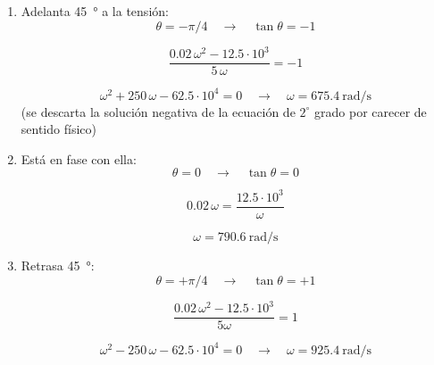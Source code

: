 \begin{enumerate}
\item Adelanta \qty{45}{\degree} a la tensión:
  \begin{equation*}
    \theta = -\pi/4 \quad \rightarrow \quad \tan \theta = -1
  \end{equation*}

  \begin{equation*}
    \frac{0.02\,\omega^2 - 12.5\cdot 10^3}{5\,\omega} = -1
  \end{equation*}

  \begin{equation*}
    \omega^2 + 250\,\omega - 62.5\cdot 10^4 = 0 \quad \rightarrow \quad \boxed{\omega = \qty{675.4}{\radian\per\second}}
  \end{equation*}
  (se descarta la solución negativa de la ecuación de $2^\circ$ grado por carecer de sentido físico)

\vspace{3mm}
  
\item Está en fase con ella:
  \begin{equation*}
    \theta = 0 \quad \rightarrow \quad \tan \theta = 0
  \end{equation*}

  \begin{equation*}
    0.02\,\omega = \frac{12.5\cdot 10^3}{\omega}
  \end{equation*}

  \begin{equation*}
    \boxed{\omega = \qty{790.6}{\radian\per\second}}
  \end{equation*}
  
\item Retrasa \qty{45}{\degree}:
  \begin{equation*}
    \theta = +\pi/4 \quad \rightarrow \quad \tan \theta = +1
  \end{equation*}

  \begin{equation*}
    \frac{0.02\,\omega^2 - 12.5\cdot 10^3}{5\omega} = 1
  \end{equation*}

  \begin{equation*}
    \omega^2 - 250\,\omega - 62.5\cdot 10^4 = 0 \quad \rightarrow \quad \boxed{\omega = \qty{925.4}{\radian\per\second}}
  \end{equation*}

\end{enumerate}


